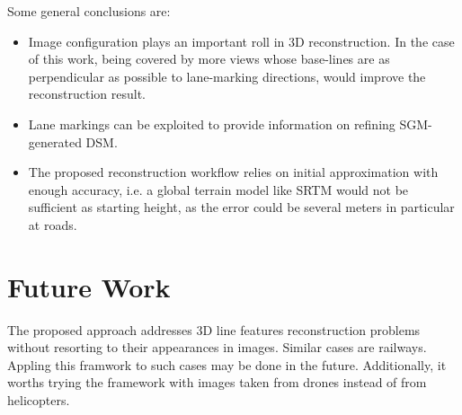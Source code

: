 

Some general conclusions are:
\begin{itemize}
	\item Image configuration plays an important roll in 3D reconstruction. In the case of this work, being covered by more views whose base-lines are as perpendicular as possible to lane-marking directions, would improve the reconstruction result.
	
	\item Lane markings can be exploited to provide information on refining SGM-generated DSM.%

	\item The proposed reconstruction workflow relies on initial approximation with enough accuracy, i.e. a global terrain model like SRTM would not be sufficient as starting height, as the error could be several meters in particular at roads.
\end{itemize}





\section*{Future Work}
\label{chap:futurework}



The proposed approach addresses 3D line features reconstruction problems without resorting to their appearances in images. Similar cases are railways. Appling this framwork to such cases may be done in the future. Additionally, it worths trying the framework with images taken from drones instead of from helicopters.

